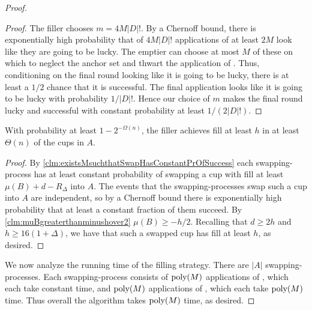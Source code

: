 \begin{proof}
\begin{proof}
  The filler chooses $m = 4 M |D|!$. By a Chernoff bound, there is
  exponentially high probability that of $4 M |D|!$ applications
  of \randalg at least $2M$ look like they are going to be lucky. 
  The emptier can choose at most $M$ of these on which to neglect
  the anchor set and thwart the application of \randalg. Thus,
  conditioning on the final round looking like it is going to be
  lucky, there is at least a $1/2$ chance that it is successful.
  The final application looks like it is going to be lucky with
  probability $1/|D|!$. 
  Hence our choice of $m$ makes the final round lucky
  and successful with constant probability at least $1/(2|D|!)$.
\end{proof}

\begin{clm}
With probability at least $1-2^{-\Omega(n)}$, the filler achieves fill
at least $h$ in at least $\Theta(n)$ of the cups in $A$. 
\end{clm}
\begin{proof}
  By \cref{clm:existsMsuchthatSwapHasConstantPrOfSuccess} each
  swapping-process has at least constant probability of swapping
  a cup with fill at least $\mu(B) + d - R_\Delta$ into $A$. The
  events that the swapping-processes swap such a cup into $A$ are
  independent, so by a Chernoff bound there is exponentially high
  probability that at least a constant fraction of them succeed.
  By \cref{clm:muBgreaterthanminushover2} $\mu(B) \ge -h/2$.
  Recalling that $d\ge 2h$ and $h \ge 16(1+\Delta)$, we have that
  such a swapped cup has fill at least $h$, as desired.
\end{proof}

We now analyze the running time of the filling strategy.
There are $|A|$ swapping-processes. Each swapping-process
consists of $\operatorname{\text{poly}}(M)$ applications of \randalg, which each take
constant time, and $\operatorname{\text{poly}}(M)$
applications of \flatalg, which each take $\operatorname{\text{poly}}(M)$ time.
Thus overall the algorithm takes $\operatorname{\text{poly}}(M)$ time, as desired.
  
\end{proof}

